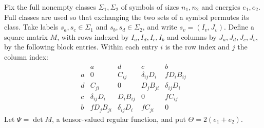 Fix the full nonempty classes $\Sigma_1,\Sigma_2$ of symbols of sizes $n_1,n_2$ and energies $e_1,e_2$. Full classes are used so that exchanging the two sets of a symbol permutes its class. Take labels $s_a,s_c\in\Sigma_1$ and $s_b,s_d\in\Sigma_2$, and write $s_v=(I_v,J_v)$. Define a square matrix $M$, with rows indexed by $I_a,I_d,I_c,I_b$ and columns by $J_a,J_d,J_c,J_b$, by the following block entries. Within each entry $i$ is the row index and $j$ the column index:
\[
\begin{array}{c|cccc}
 &a&d&c&b\\\hline
 a&0&C_{ij}&\delta_{ij}D_i&fD_iB_{ij}\\
 d&C_{ji}&0&D_jB_{ji}&\delta_{ij}D_i\\
 c&\delta_{ij}D_i&D_iB_{ij}&0&fC_{ij}\\
 b&fD_jB_{ji}&\delta_{ij}D_i&fC_{ji}&0
\end{array}
\]
Let $\Psi=\det M$, a tensor-valued regular function, and put $\Theta=2(e_1+e_2)$.

